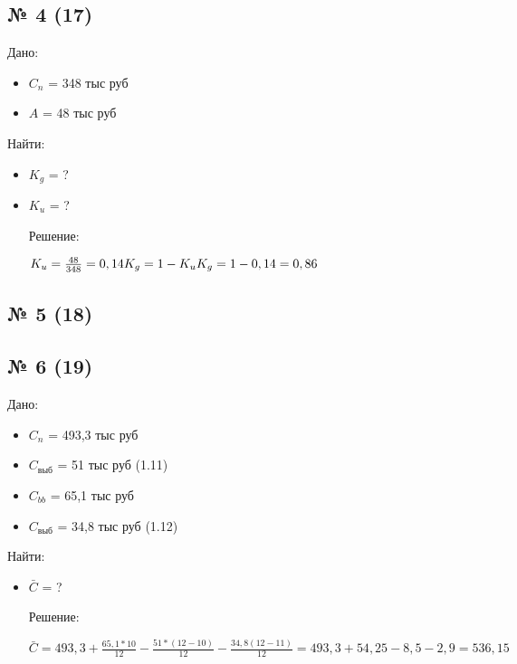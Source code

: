 \documentclass[11pt]{article}
\begin{document}
\subsection{№ 4 (17)}
\label{sec:orgdcff5fa}

Дано:
\begin{itemize}
\item \(C_{n}\) = 348 тыс руб
\item \(A\) = 48 тыс руб
\end{itemize}
Найти:

\begin{itemize}
\item \(K_{g}\) = ?
\item \(K_{u}\) = ?

Решение:

\begin{math}
K_{u} = \frac{48}{348} = 0,14 \\
K_{g} = 1 - K_{u} \\
K_{g} = 1 - 0,14 = 0,86
\end{math}
\end{itemize}



\subsection{№ 5 (18)}
\label{sec:org552ec16}


\subsection{№ 6 (19)}
\label{sec:org2e83172}

Дано:
\begin{itemize}
\item \(C_{n}\) = 493,3 тыс руб
\item \(C_{\text{выб}}\) = 51 тыс руб (1.11)
\item \(C_{bb}\) = 65,1 тыс руб
\item \(C_{\text{выб}}\) = 34,8 тыс руб (1.12)
\end{itemize}

Найти:

\begin{itemize}
\item \(\bar{C}\) = ?

Решение:

\begin{math}
\bar{C} = 493,3 + \frac{65,1*10}{12} - \frac{51*(12-10)}{12} - \frac{34,8(12-11)}{12} = 493,3 + 54,25 - 8,5 - 2,9 = 536,15
 \end{math}
\end{itemize}
\end{document}
